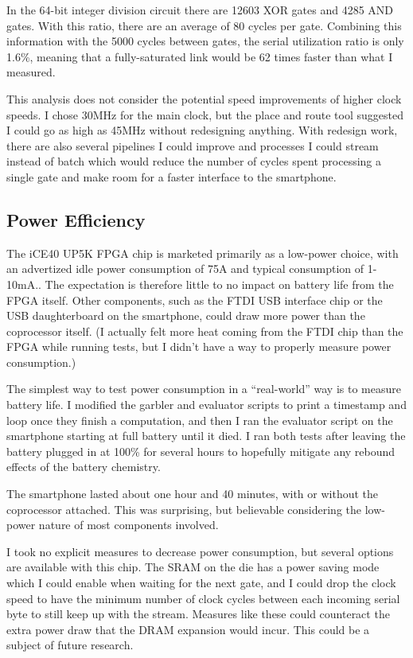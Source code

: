 In the 64-bit integer division circuit\cite{bristol} there are 12603 XOR gates and 4285 AND gates. With this ratio, there are an average of 80 cycles per gate. Combining this information with the 5000 cycles between gates, the serial utilization ratio is only 1.6\%, meaning that a fully-saturated link would be 62 times faster than what I measured.

This analysis does not consider the potential speed improvements of higher clock speeds. I chose 30MHz for the main clock, but the place and route tool suggested I could go as high as 45MHz without redesigning anything. With redesign work, there are also several pipelines I could improve and processes I could stream instead of batch which would reduce the number of cycles spent processing a single gate and make room for a faster interface to the smartphone.


\subsection{Power Efficiency}
The iCE40 UP5K FPGA chip is marketed primarily as a low-power choice, with an advertized idle power consumption of 75\textmu{}A and typical consumption of 1-10mA.\cite{LatticePage}. The expectation is therefore little to no impact on battery life from the FPGA itself. Other components, such as the FTDI USB interface chip or the USB daughterboard on the smartphone, could draw more power than the coprocessor itself. (I actually felt more heat coming from the FTDI chip than the FPGA while running tests, but I didn't have a way to properly measure power consumption.)

The simplest way to test power consumption in a ``real-world'' way is to measure battery life. I modified the garbler and evaluator scripts to print a timestamp and loop once they finish a computation, and then I ran the evaluator script on the smartphone starting at full battery until it died. I ran both tests after leaving the battery plugged in at 100\% for several hours to hopefully mitigate any rebound effects of the battery chemistry.

The smartphone lasted about one hour and 40 minutes, with or without the coprocessor attached. This was surprising, but believable considering the low-power nature of most components involved.

I took no explicit measures to decrease power consumption, but several options are available with this chip. The SRAM on the die has a power saving mode which I could enable when waiting for the next gate, and I could drop the clock speed to have the minimum number of clock cycles between each incoming serial byte to still keep up with the stream. Measures like these could counteract the extra power draw that the DRAM expansion would incur. This could be a subject of future research.
